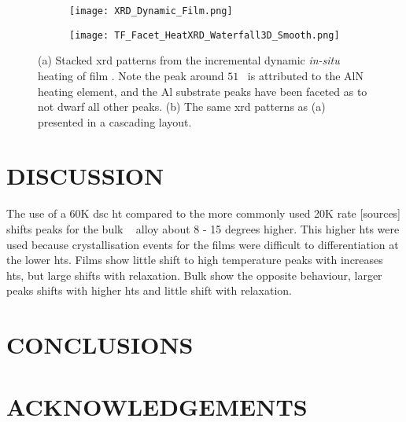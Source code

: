 \documentclass[a4paper,12pt,oneside]{article}%
\begin{document}
\begin{figure}[b]
	\centering
	\begin{subfigure}[htbp]{0.75\textwidth}
		\texttt{[image: XRD\_Dynamic\_Film.png]}
		\caption{}
		\label{fig:XRD_Dynamic_FullStack_Film}
	\end{subfigure}
	\begin{subfigure}[htbp]{0.75\textwidth}
		\texttt{[image: TF\_Facet\_HeatXRD\_Waterfall3D\_Smooth.png]}
		\caption{}
		\label{fig:XRD_Dynamic_WaterFall_Film}
	\end{subfigure}
	\caption{(a) Stacked \acrshort{xrd} patterns from the incremental dynamic \textit{in-situ} heating of film \MgZnCa. Note the peak around $51$\degree~ is attributed to the AlN heating element, and the Al substrate peaks have been faceted as to not dwarf all other peaks. (b) The same \acrshort{xrd} patterns as (a) presented in a cascading layout.}%
	\label{fig:XRD_Dynamic_Film}
\end{figure}


\section{DISCUSSION}

The use of a 60K \gls{dsc} \acrfull{ht} compared to the more commonly used 20K rate [sources] shifts peaks for the bulk \MgZnCa~ alloy about 8 - 15 degrees higher. This higher \glspl{ht} were used because crystallisation events for the films were difficult to differentiation at the lower \glspl{ht}. 
Films show little shift to high temperature peaks with increases \glspl{ht}, but large shifts with relaxation. 
Bulk show the opposite behaviour, larger peaks shifts with higher \glspl{ht} and little shift with relaxation.


\section{CONCLUSIONS}


\section{ACKNOWLEDGEMENTS}
\end{document}
